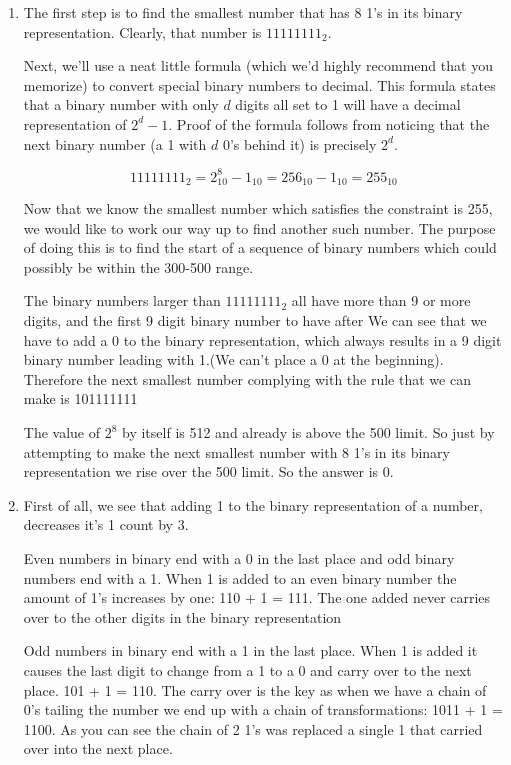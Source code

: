 \documentclass{pset_template}
\begin{document}
\begin{enumerate}

\item
The first step is to find the smallest number that has 8 1's in its binary representation. Clearly, that number is $11111111_2$. 

Next, we'll use a neat little formula (which we'd highly recommend that you memorize) to convert special binary numbers to decimal. This formula states that a binary number with only $d$ digits all set to 1 will have a decimal representation of $2^d-1$. Proof of the formula follows from noticing that the next binary number (a 1 with $d$ 0's behind it) is precisely $2^d$.

\[11111111_2 = 2^8_{10}-1_{10} = 256_{10}-1_{10} = 255_{10}\]

Now that we know the smallest number which satisfies the constraint is 255, we would like to work our way up to find another such number. The purpose of doing this is to find the start of a sequence of binary numbers which could possibly be within the 300-500 range.

The binary numbers larger than $11111111_2$ all have more than 9 or more digits, and the first 9 digit binary number to have after We can see that we have to add a 0 to the binary representation, which always results in a 9 digit binary number leading with 1.(We can't place a 0 at the beginning). Therefore the next smallest number complying with the rule that we can make is 101111111 

The value of $2^8$ by itself is 512 and already is above the 500 limit. So just by attempting to make the next smallest number with 8 1's in its binary representation we rise over the 500 limit. So the answer is 0.

\item
First of all, we see that adding 1 to the binary representation of a number, decreases it's 1 count by 3. 

Even numbers in binary end with a 0 in the last place and odd binary numbers end with a 1. When 1 is added to an even binary number the amount of 1's increases by one: 110 + 1 = 111. The one added never carries over to the other digits in the binary representation

Odd numbers in binary end with a 1 in the last place. When 1 is added it causes the last digit to change from a 1 to a 0 and carry over to the next place. 101 + 1 = 110. The carry over is the key as when we have a chain of 0's tailing the number we end up with a chain of transformations: 1011 + 1 = 1100. As you can see the chain of 2 1's was replaced a single 1 that carried over into the next place. 


\end{enumerate}
\end{document}
